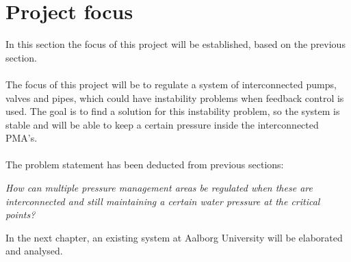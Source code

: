 \section{Project focus}
\label{sec:problem_statement}
In this section the focus of this project will be established, based on the previous section.
\\
\\
The focus of this project will be to regulate a system of interconnected pumps, valves and pipes, which could have instability problems when feedback control is used. %
The goal is to find a solution for this instability problem, so the system is stable and will be able to keep a certain pressure inside the interconnected PMA's. 
\\
\\
The problem statement has been deducted from previous sections:
\begin{center}
\label{ProblemStatement}
\textit{How can multiple pressure management areas be regulated when these are interconnected and still maintaining a certain water pressure at the critical points?}
\end{center}

In the next chapter, an existing system at Aalborg University will be elaborated and analysed.
